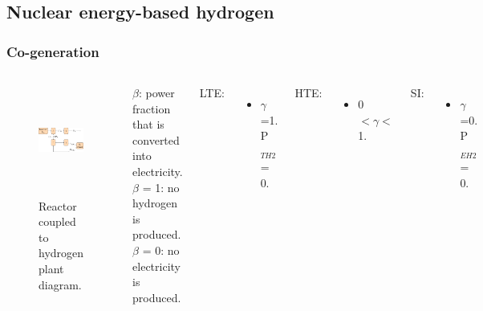 \subsection{Nuclear energy-based hydrogen}
\begin{frame}
\frametitle{Co-generation}
\begin{columns}
    \column[t]{6.5cm}
   	\begin{figure}[htbp!]
		\begin{center}
			\includegraphics[height=3.6cm]{images/hte-figure0.png}
		\end{center}
		\caption{Reactor coupled to hydrogen plant diagram.}
 	\end{figure}

 	\column[t]{3.5cm}
 	$\beta$: power fraction that is converted into electricity.
 	\\
    $\beta$ = 1: no hydrogen is produced.
    \\
 	$\beta$ = 0: no electricity is produced. \vspace{0.6cm}

 	LTE:
 	\begin{itemize}
 		\item $\gamma$=1. P$_{TH2}$ = 0.
 	\end{itemize}

 	HTE:
 	\begin{itemize}
 		\item 0 $< \gamma <$ 1.
 	\end{itemize}

    SI:
 	\begin{itemize}
 		\item $\gamma$=0. P$_{EH2}$ = 0.
 	\end{itemize}
\end{columns}
\end{frame}